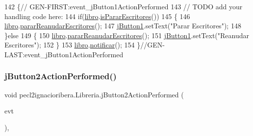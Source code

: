 \begin{DoxyCode}
142                                                                          \{\textcolor{comment}{//
      GEN-FIRST:event\_jButton1ActionPerformed}
143         \textcolor{comment}{// TODO add your handling code here:}
144         \textcolor{keywordflow}{if}(\mbox{\hyperlink{classpecl2ignacioribera_1_1_libreria_afba80788cd6e1d2b13159d886cc3b15d}{libro}}.\mbox{\hyperlink{classpecl2ignacioribera_1_1_libro_aabc572905978f8f3e19dd6533084149a}{isPararEscritores}}())
145         \{
146             \mbox{\hyperlink{classpecl2ignacioribera_1_1_libreria_afba80788cd6e1d2b13159d886cc3b15d}{libro}}.\mbox{\hyperlink{classpecl2ignacioribera_1_1_libro_aa841d46804bc4a70f1f1fc5300257380}{pararReanudarEscritores}}();
147             \mbox{\hyperlink{classpecl2ignacioribera_1_1_libreria_a50c2a801f0096a4409e9348d6df5cd09}{jButton1}}.setText(\textcolor{stringliteral}{"Parar Escritores"});
148         \}\textcolor{keywordflow}{else}
149         \{
150             \mbox{\hyperlink{classpecl2ignacioribera_1_1_libreria_afba80788cd6e1d2b13159d886cc3b15d}{libro}}.\mbox{\hyperlink{classpecl2ignacioribera_1_1_libro_aa841d46804bc4a70f1f1fc5300257380}{pararReanudarEscritores}}();
151             \mbox{\hyperlink{classpecl2ignacioribera_1_1_libreria_a50c2a801f0096a4409e9348d6df5cd09}{jButton1}}.setText(\textcolor{stringliteral}{"Reanudar Escritores"});
152         \}
153         \mbox{\hyperlink{classpecl2ignacioribera_1_1_libreria_afba80788cd6e1d2b13159d886cc3b15d}{libro}}.\mbox{\hyperlink{classpecl2ignacioribera_1_1_libro_a44cfbf7f47ada045300c48a3712aa804}{notificar}}();
154     \}\textcolor{comment}{//GEN-LAST:event\_jButton1ActionPerformed}
\end{DoxyCode}
\mbox{\label{classpecl2ignacioribera_1_1_libreria_ab8cd51249b59ff462fef7822d230c92b}} 
\subsubsection{\texorpdfstring{j\+Button2\+Action\+Performed()}{jButton2ActionPerformed()}}
{\footnotesize\ttfamily void pecl2ignacioribera.\+Libreria.\+j\+Button2\+Action\+Performed (\begin{DoxyParamCaption}\item[{java.\+awt.\+event.\+Action\+Event}]{evt }\end{DoxyParamCaption})\hspace{0.3cm}{\ttfamily [inline]}, {\ttfamily [private]}}


